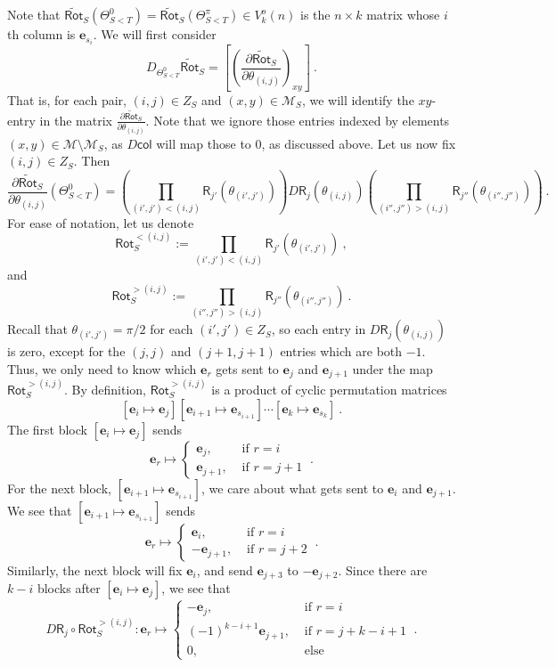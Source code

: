 \documentclass{article}
\newcommand{\mc}[1]{\mathcal{#1}}
\newcommand{\msf}[1]{\mathsf{#1}}
\newcommand{\mbf}[1]{\mathbf{#1}}
\newcommand{\trot}{\widetilde{\msf{Rot}}}
\newcommand{\col}{\msf{col}}
\newcommand{\e}{\mbf{e}}
\theoremstyle{definition}
\begin{document}
Note that 
$\trot_S(\Theta^0_{S<T}) =\trot_S(\Theta^\pi_{S<T}) \in V^o_k(n)$ is the $n \times k$ matrix whose $i$th 
column is $\e_{s_i}$. 
We will first consider
$$D_{\Theta^0_{S<T}} \trot_S = \left[ \left(\frac{\partial{\trot_S}}{\partial \theta_{(i,j)}}\right)_{xy} \right]~.$$
That is, for each pair, $(i,j) \in Z_S$ and $(x,y) \in \mc{M}_S$, we will identify the $xy$-entry in the 
matrix $\frac{\partial{\trot_S}}{\partial \theta_{(i,j)}}$. Note that we ignore those entries indexed by elements
$(x,y) \in \mc{M} \setminus \mc{M}_S$, as $D\col$ will map those to 0, as discussed above.
Let us now fix $(i,j) \in Z_S$. Then
$$\frac{\partial{\trot_S}}{\partial \theta_{(i,j)}}(\Theta_{S<T}^0) = 
    \left( \prod_{(i',j') < (i,j)} \msf{R}_{j'}(\theta_{(i',j')})\right) D\msf{R}_j(\theta_{(i,j)}) 
    \left( \prod_{(i'',j'')>(i,j)} \msf{R}_{j''}(\theta_{(i'',j'')})\right)~.$$
For ease of notation, let us denote
$$\msf{Rot}^{<(i,j)}_S := \prod_{(i',j') < (i,j)} \msf{R}_{j'}(\theta_{(i',j')})~,$$
and 
$$\msf{Rot}^{>(i,j)}_S:=\prod_{(i'',j'')>(i,j)} \msf{R}_{j''}(\theta_{(i'',j'')})~.$$
Recall that $\theta_{(i',j')} = \pi/2$ for each $(i',j') \in Z_S$, so each entry in $D\msf{R}_j(\theta_{(i,j)})$ is zero,
except for the $(j,j)$ and $(j+1,j+1)$ entries which are both $-1$. Thus, we only need to know which $\e_r$ gets
sent to $\e_j$ and $\e_{j+1}$ under the map $\msf{Rot}^{>(i,j)}_S$. By definition, $\msf{Rot}^{>(i,j)}_S$
is a product of cyclic permutation matrices
$$[\e_i \mapsto \e_j] [\e_{i+1} \mapsto \e_{s_{i+1}}] \cdots [\e_k \mapsto \e_{s_k}]~.$$
The first block $[\e_i \mapsto \e_j]$ sends
$$\e_r \mapsto \begin{cases} \e_j, &\text{ if } r=i \\
                                                  \e_{j+1}, &\text{ if } r=j+1
                         \end{cases} ~.$$
For the next block, $[\e_{i+1} \mapsto \e_{s_{i+1}}]$, we care about what gets sent to $\e_i$ and $\e_{j+1}$.
We see that $[\e_{i+1} \mapsto \e_{s_{i+1}}]$ sends
$$\e_r \mapsto \begin{cases} \e_i, &\text{ if } r=i \\
                                                  -\e_{j+1}, &\text{ if } r=j+2 
                         \end{cases} ~.$$
Similarly, the next block will fix $\e_i$, and send $\e_{j+3}$ to $-\e_{j+2}$. Since there are $k-i$ blocks after
$[\e_i \mapsto \e_j]$, we see that
$$D\msf{R}_j \circ \msf{Rot}^{>(i,j)}_S : \e_r \mapsto \begin{cases} -\e_j, &\text{ if } r=i \\
                                                                                          (-1)^{k-i+1}\e_{j+1}, &\text{ if } r=j+k-i+1 \\
                                                                                          0, &\text{ else}
                                                                    \end{cases} ~.$$
\end{document}
